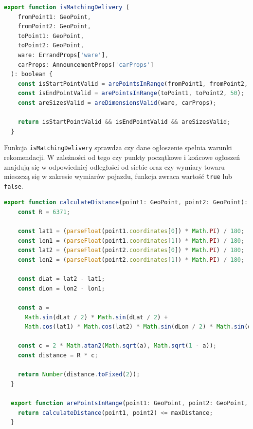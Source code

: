 \pagebreak
{\belowcaptionskip=-9pt
\begin{lstlisting}[language=JavaScript,caption=Funkcja sprawdzająca warunki powiązania ogłoszeń, label=lst:isMatchingDelivery]
    export function isMatchingDelivery (
    fromPoint1: GeoPoint,
    fromPoint2: GeoPoint,
    toPoint1: GeoPoint,
    toPoint2: GeoPoint,
    ware: ErrandProps['ware'],
    carProps: AnnouncementProps['carProps']
  ): boolean {
    const isStartPointValid = arePointsInRange(fromPoint1, fromPoint2, 50);
    const isEndPointValid = arePointsInRange(toPoint1, toPoint2, 50);
    const areSizesValid = areDimensionsValid(ware, carProps);

    return isStartPointValid && isEndPointValid && areSizesValid;
  }
\end{lstlisting}
}

Funkcja \texttt{isMatchingDelivery} sprawdza czy dane ogłoszenie spełnia warunki rekomendacji. W zależności od tego czy punkty początkowe i końcowe ogłoszeń znajdują się w odpowiedniej odległości od siebie oraz czy wymiary towaru mieszczą się w zakresie wymiarów pojazdu, funkcja zwraca wartość \texttt{true} lub \texttt{false}.

\pagebreak
{\belowcaptionskip=-9pt
\begin{lstlisting}[language=JavaScript,caption=Funkcje obliczająca odległość między punktami, label=lst:calculateDistance]
  export function calculateDistance(point1: GeoPoint, point2: GeoPoint): number {
    const R = 6371;

    const lat1 = (parseFloat(point1.coordinates[0]) * Math.PI) / 180;
    const lon1 = (parseFloat(point1.coordinates[1]) * Math.PI) / 180;
    const lat2 = (parseFloat(point2.coordinates[0]) * Math.PI) / 180;
    const lon2 = (parseFloat(point2.coordinates[1]) * Math.PI) / 180;

    const dLat = lat2 - lat1;
    const dLon = lon2 - lon1;

    const a =
      Math.sin(dLat / 2) * Math.sin(dLat / 2) +
      Math.cos(lat1) * Math.cos(lat2) * Math.sin(dLon / 2) * Math.sin(dLon / 2);

    const c = 2 * Math.atan2(Math.sqrt(a), Math.sqrt(1 - a));
    const distance = R * c;

    return Number(distance.toFixed(2));
  }

  export function arePointsInRange(point1: GeoPoint, point2: GeoPoint, maxDistance: number): boolean {
    return calculateDistance(point1, point2) <= maxDistance;
  }
\end{lstlisting}
}

